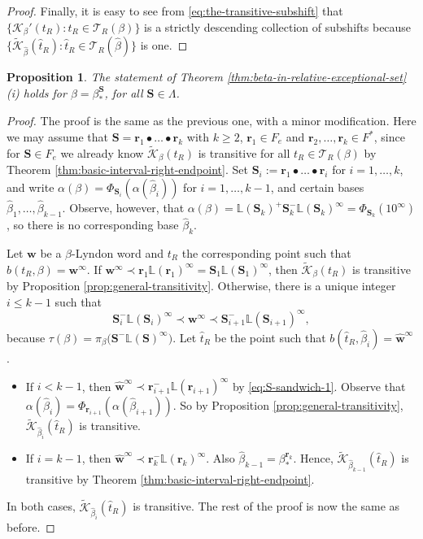 \documentclass[11pt]{amsart}
\newtheorem{proposition}[theorem]{Proposition}
\theoremstyle{definition}
\theoremstyle{remark}
\numberwithin{equation}{section}
\renewcommand{\L}{\ensuremath{\mathbb{L}}}
\newcommand{\F}{F^*}
\newcommand{\Kt}{\widetilde{\mathcal{K}}}
\newcommand{\cs}{ {\mathbf{S}}}
\renewcommand{\r}{ {\mathbf{r}}}
\newcommand{\w}{\mathbf{w}}
\newcommand{\f}{\infty}
\newcommand{\al}{\alpha}
\newcommand{\La}{\Lambda}
\begin{document}
\begin{proof}
Finally, it is easy to see from \eqref{eq:the-transitive-subshift} that $\{\mathcal{K}_\beta'(t_R): t_R\in\mathcal{T}_R(\beta)\}$ is a strictly descending collection of subshifts because $\{\Kt_{\hat\beta}(\hat{t}_R): \hat{t}_R\in\mathcal{T}_R(\hat{\beta})\}$ is one.
\end{proof}

\begin{proposition} \label{prop:transitive-subshifts-special-case}
The statement of Theorem \ref{thm:beta-in-relative-exceptional-set} (i) holds for $\beta=\beta_*^\cs$, for all $\cs\in\La$.
\end{proposition}

\begin{proof}
The proof is the same as the previous one, with a minor modification. Here we may assume that $\cs=\r_1\bullet\dots\bullet\r_k$ with $k\geq 2$, {$\r_1\in F_e$ and $\r_2,\dots,\r_k\in\F$, since for $\cs\in F_e$} we already know $\Kt_\beta(t_R)$ is transitive for all $t_R\in\mathcal{T}_R(\beta)$ by Theorem \ref{thm:basic-interval-right-endpoint}. Set $\cs_i:=\r_1\bullet\dots\bullet\r_i$ for $i=1,\dots,k$, and write $\al(\beta)=\Phi_{\cs_i}(\al(\hat{\beta}_i))$ for $i=1,\dots,k-1$, and certain bases $\hat{\beta}_1,\dots,\hat{\beta}_{k-1}$. Observe, however, that $\al(\beta)=\L(\cs_k)^+\cs_k^-\L(\cs_k)^\f=\Phi_{\cs_k}(10^\f)$, so there is no corresponding base $\hat{\beta}_k$.

Let $\w$ be a $\beta$-Lyndon word and $t_R$ the corresponding point such that $b(t_R,\beta)=\w^\f$. If $\w^\f\prec \r_1\L(\r_1)^\f=\cs_1\L(\cs_1)^\f$, then $\Kt_\beta(t_R)$ is transitive by Proposition \ref{prop:general-transitivity}. Otherwise, there is a unique integer $i\leq k-1$ such that
\begin{equation} \label{eq:S-sandwich-1}
\cs_i^-\L(\cs_i)^\f\prec \w^\f\prec \cs_{i+1}^-\L(\cs_{i+1})^\f,
\end{equation}
because $\tau(\beta)=\pi_\beta\big(\cs^-\L(\cs)^\f\big)$. Let $\hat{t}_R$ be the point such that $b(\hat{t}_R,\hat{\beta}_i)=\hat{\w}^\f$. %
\begin{itemize}
\item If $i<k-1$, then $\hat{\w}^\f\prec \r_{i+1}^-\L(\r_{i+1})^\f$ by \eqref{eq:S-sandwich-1}. Observe that $\al(\hat{\beta}_i)=\Phi_{\r_{i+1}}(\al(\hat{\beta}_{i+1}))$. So by Proposition \ref{prop:general-transitivity}, $\Kt_{\hat\beta_i}(\hat{t}_R)$ is transitive.
\item If $i=k-1$, then $\hat{\w}^\f\prec \r_k^-\L(\r_k)^\f$. Also ${\hat{\beta}_{k-1}}=\beta_*^{\r_k}$. Hence, $\Kt_{\hat\beta_{k-1}}(\hat{t}_R)$ is transitive by Theorem \ref{thm:basic-interval-right-endpoint}.
\end{itemize}
In both cases, $\Kt_{\hat\beta_i}(\hat{t}_R)$ is transitive. The rest of the proof is now the same as before.
\end{proof}
\end{document}
